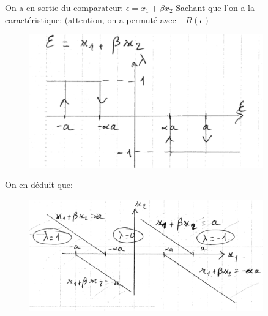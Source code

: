 \documentclass{../../td}
\begin{document}
\begin{enumerate}
\newpage
On a en sortie du comparateur: $\epsilon = x_1 + \beta x_2$
Sachant que l'on a la caractéristique: (attention, on a permuté avec $-R(\epsilon)$
\begin{figure}[ht]
  \centering
  \includegraphics[width=0.9\textwidth]{2}
  \caption{ }
  \label{fig:label}
\end{figure}
On en déduit que:
\begin{figure}[ht]
  \centering
  \includegraphics[width=0.9\textwidth]{3}
  \caption{ }
  \label{fig:label}
\end{figure}


\end{enumerate}
\end{document}
